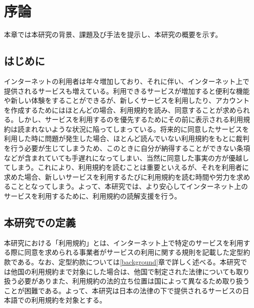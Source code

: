 \chapter{序論}
\label{introduction}

本章では本研究の背景、課題及び手法を提示し、本研究の概要を示す。

\section{はじめに}
\label{introduction:background}
インターネットの利用者は年々増加しており、それに伴い、インターネット上で提供されるサービスも増えている。利用できるサービスが増加すると便利な機能や新しい体験をすることができるが、新しくサービスを利用したり、アカウントを作成するためにはほとんどの場合、利用規約を読み、同意することが求められる。しかし、サービスを利用するのを優先するためにその前に表示される利用規約は読まれないような状況に陥ってしまっている。将来的に同意したサービスを利用した時に問題が発生した場合、ほとんど読んでいない利用規約をもとに裁判を行う必要が生じてしまうため、このときに自分が納得することができない条項などが含まれていても手遅れになってしまい、当然に同意した事実の方が優越してしまう。これにより、利用規約を読むことは重要といえるが、それを利用者に求めた場合、新しいサービスを利用するたびに利用規約を読む時間や労力を求めることとなってしまう。よって、本研究では、より安心してインターネット上のサービスを利用するために、利用規約の読解支援を行う。

\section{本研究での定義}
本研究における「利用規約」とは、インターネット上で特定のサービスを利用する際に同意を求められる事業者がサービスの利用に関する規則を記載した定型約款である。なお、定型約款については\ref{background}章で詳しく述べる。本研究では他国の利用規約まで対象にした場合は、他国で制定された法律についても取り扱う必要がありまた、利用規約の法的立ち位置は国によって異なるため取り扱うことが困難である。よって、本研究は日本の法律の下で提供されるサービスの日本語での利用規約を対象とする。




